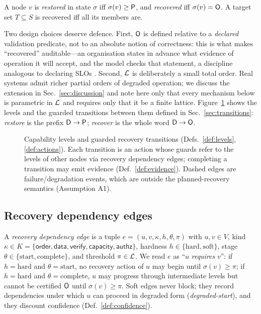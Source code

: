\begin{definition}
\label{def:restorerecover}
A node $v$ is \emph{restored} in state $\sigma$ iff $\sigma(v) \geq \mathsf{P}$, and \emph{recovered} iff $\sigma(v) = \mathsf{O}$. A target set $T \subseteq S$ is recovered iff all its members are.
\end{definition}

Two design choices deserve defence. First, $\mathsf{O}$ is defined relative to a \emph{declared} validation predicate, not to an absolute notion of correctness: this is what makes ``recovered'' auditable---an organisation states in advance what evidence of operation it will accept, and the model checks that statement, a discipline analogous to declaring SLOs \citep{beyer2016sre}. Second, $\mathcal{L}$ is deliberately a small total order. Real systems admit richer partial orders of degraded operation; we discuss the extension in Sec.~\ref{sec:discussion} and note here only that every mechanism below is parametric in $\mathcal{L}$ and requires only that it be a finite lattice. Figure~\ref{fig:lts} shows the levels and the guarded transitions between them defined in Sec.~\ref{sec:transitions}: \emph{restore} is the prefix $\mathsf{D} \to \mathsf{P}$; \emph{recover} is the whole word $\mathsf{D} \to \mathsf{O}$.

\begin{figure}[t]
  \centering
  
  \caption{Capability levels and guarded recovery transitions (Defs.~\ref{def:levels}, \ref{def:actions}). Each transition is an action whose guards refer to the levels of other nodes via recovery dependency edges; completing a transition may emit evidence (Def.~\ref{def:evidence}). Dashed edges are failure/degradation events, which are outside the planned-recovery semantics (Assumption A1).}
  \label{fig:lts}
\end{figure}

\subsection{Recovery dependency edges}
\label{sec:redges}

\begin{definition}
\label{def:redge}
A \emph{recovery dependency edge} is a tuple $e = (u, v, \kappa, h, \theta, \pi)$ with $u, v \in V$, kind $\kappa \in K = \{\textsf{order}, \textsf{data}, \textsf{verify}, \textsf{capacity}, \textsf{authz}\}$, hardness $h \in \{\text{hard}, \text{soft}\}$, stage $\theta \in \{\text{start}, \text{complete}\}$, and threshold $\pi \in \mathcal{L}$. We read $e$ as ``$u$ \emph{requires} $v$'': if $h = \text{hard}$ and $\theta = \text{start}$, no recovery action of $u$ may begin until $\sigma(v) \geq \pi$; if $h = \text{hard}$ and $\theta = \text{complete}$, $u$ may progress through intermediate levels but cannot be certified $\mathsf{O}$ until $\sigma(v) \geq \pi$. Soft edges never block; they record dependencies under which $u$ can proceed in degraded form (\emph{degraded-start}), and they discount confidence (Def.~\ref{def:confidence}).
\end{definition}

